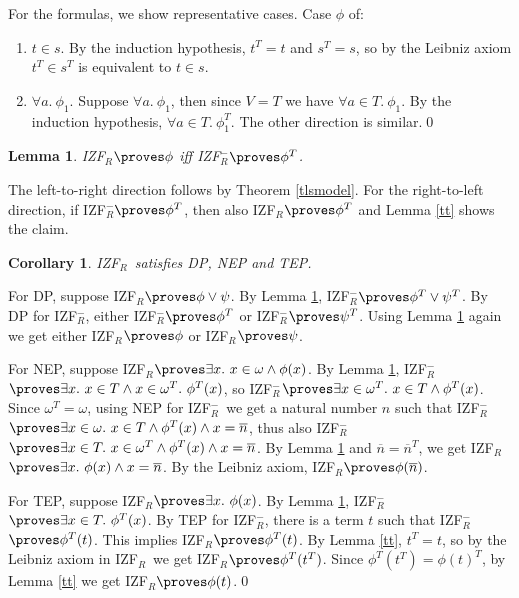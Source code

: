 \documentclass{LMCS}
\newtheorem{corollary}[thm]{Corollary}
\newtheorem{lemma}[thm]{Lemma}
\newcommand{\ov}[1]{\ensuremath{\overline{#1}}}
\newcommand{\p}{\proves}
\newcommand{\izfr}{IZF${}_R$}
\newcommand{\iizf}{IZF${}_R^{-}$}
\begin{document}
For the formulas, we show representative cases. Case $\phi$ of:
\begin{enumerate}[$\bullet$]
\item $t \in s$. By the induction hypothesis, $t^T =
t$ and $s^T = s$, so by the Leibniz axiom $t^T \in s^T$ is equivalent to $t \in s$.
\item $\forall a.\ \phi_1$. Suppose $\forall a.\ \phi_1$, then since $V = T$ we
have $\forall a \in T.\ \phi_1$. By the induction hypothesis, $\forall a \in
T.\ \phi_1^T$. The other direction is similar.\qed
\end{enumerate}


\begin{lemma}\label{liff}
\izfr $\p \phi$ iff \iizf $\p \phi^T$. 
\end{lemma}
\proof The left-to-right direction follows by Theorem \ref{tlsmodel}. For the
right-to-left direction, if \iizf $\p \phi^T$, then also \izfr $\p \phi^T$
and Lemma \ref{tt} shows the claim.\proof


\begin{corollary}\label{dpnep}
\izfr\ satisfies DP, NEP and  TEP. 
\end{corollary}
\proof For DP, suppose \izfr $\p \phi \lor \psi$. By Lemma \ref{liff},
\iizf $\p \phi^T \lor \psi^T$. By DP for \iizf, either \iizf $\p \phi^T$ or
\iizf $\p \psi^T$. Using Lemma \ref{liff} again we get either \izfr $\p \phi$ or
\izfr $\p \psi$.

For NEP, suppose \izfr $\p \exists x.\ x \in \omega \land \phi(x)$. By Lemma
\ref{liff}, \iizf $\p \exists x.\ x \in T \land x \in \omega^{T}.\
\phi^{T}(x)$, so \iizf $\p \exists x \in \omega^T.\ x \in T
\land  \phi^{T}(x)$. Since $\omega^{T} = \omega$, using NEP for \iizf\ we get
a natural number $n$ such that \iizf $\p \exists x \in \omega.\ x \in T
\land \phi^{T}(x) \land x =
\ov{n}$, thus also \iizf $\p \exists x \in T.\ x \in \omega^T \land
\phi^T(x) \land x = \ov{n}$. By Lemma \ref{liff} and $\ov{n} = \ov{n}^T$, we get \izfr $\p
\exists x.\ \phi(x) \land x = \ov{n}$. By the Leibniz axiom, \izfr $\p \phi(\ov{n})$.

For TEP, suppose \izfr $\p \exists x.\ \phi(x)$. By Lemma \ref{liff}, \iizf
$\p \exists x \in T.\ \phi^T(x)$. By TEP for \iizf, there is a term $t$ such
that \iizf $\p \phi^T(t)$. This implies \izfr $\p \phi^T(t)$. By Lemma
\ref{tt}, $t^T = t$, so by the Leibniz axiom in \izfr\ we get \izfr $\p \phi^T(t^T)$. 
Since $\phi^T(t^T) = \phi(t)^T$, by Lemma \ref{tt} we get \izfr $\p \phi(t)$.\qed
\end{document}
